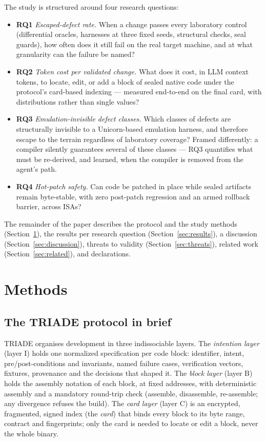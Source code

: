 \documentclass[11pt,a4paper]{article}
\newcommand{\RQ}[1]{\textbf{RQ#1}}
\begin{document}
The study is structured around four research questions:

\begin{itemize}
\item \RQ{1} \emph{Escaped-defect rate.} When a change passes every
laboratory control (differential oracles, harnesses at three fixed seeds,
structural checks, seal guards), how often does it still fail on the real
target machine, and at what granularity can the failure be named?
\item \RQ{2} \emph{Token cost per validated change.} What does it cost,
in LLM context tokens, to locate, edit, or add a block of sealed native
code under the protocol's card-based indexing --- measured end-to-end
on the final card, with distributions rather than single values?
\item \RQ{3} \emph{Emulation-invisible defect classes.} Which classes of
defects are structurally invisible to a Unicorn-based emulation harness,
and therefore escape to the terrain regardless of laboratory coverage?
Framed differently: a compiler silently guarantees several of these
classes --- RQ3 quantifies what must be re-derived, and learned, when the
compiler is removed from the agent's path.
\item \RQ{4} \emph{Hot-patch safety.} Can code be patched in place while
sealed artifacts remain byte-stable, with zero post-patch regression and
an armed rollback barrier, across ISAs?
\end{itemize}

The remainder of the paper describes the protocol and the study methods
(Section~\ref{sec:methods}), the results per research question
(Section~\ref{sec:results}), a discussion (Section~\ref{sec:discussion}),
threats to validity (Section~\ref{sec:threats}), related work
(Section~\ref{sec:related}), and declarations.

\section{Methods}\label{sec:methods}

\subsection{The TRIADE protocol in brief}\label{sec:protocole}

TRIADE organises development in three indissociable layers. The
\emph{intention layer} (layer I) holds one normalized specification per
code block: identifier, intent, pre/post-conditions and invariants, named
failure cases, verification vectors, fixtures, provenance and the
decisions that shaped it. The \emph{block layer} (layer B) holds the
assembly notation of each block, at fixed addresses, with deterministic
assembly and a mandatory round-trip check (assemble, disassemble,
re-assemble; any divergence refuses the build). The \emph{card layer}
(layer C) is an encrypted, fragmented, signed index (the \emph{card}) that
binds every block to its byte range, contract and fingerprints; only the
card is needed to locate or edit a block, never the whole binary.
\end{document}
